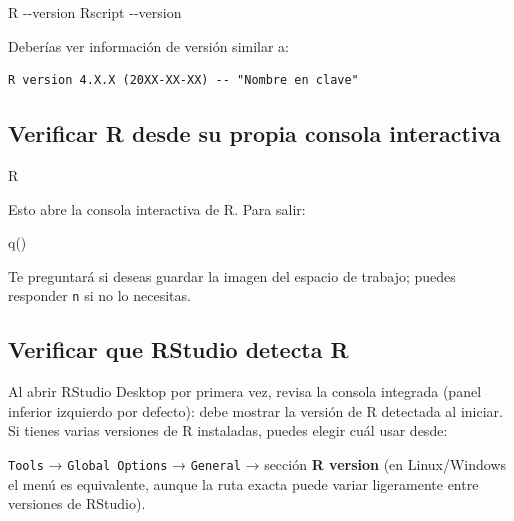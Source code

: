 \documentclass[
  man,
  floatsintext,
  longtable,
  a4paper,
  nolmodern,
  notxfonts,
  notimes,
  12pt,
  colorlinks=true,linkcolor=blue,citecolor=blue,urlcolor=blue]{apa7}
\newenvironment{Shaded}{\begin{snugshade}}{\end{snugshade}}
\newcommand{\AttributeTok}[1]{\textcolor[rgb]{0.40,0.45,0.13}{#1}}
\newcommand{\ExtensionTok}[1]{\textcolor[rgb]{0.00,0.23,0.31}{#1}}
\newcommand{\FunctionTok}[1]{\textcolor[rgb]{0.28,0.35,0.67}{#1}}
\newcommand{\NormalTok}[1]{\textcolor[rgb]{0.00,0.23,0.31}{#1}}
\begin{document}
\begin{Shaded}
\begin{Highlighting}[]
\ExtensionTok{R} \AttributeTok{{-}{-}version}
\ExtensionTok{Rscript} \AttributeTok{{-}{-}version}
\end{Highlighting}
\end{Shaded}

Deberías ver información de versión similar a:

\begin{verbatim}
R version 4.X.X (20XX-XX-XX) -- "Nombre en clave"
\end{verbatim}

\subsection{Verificar R desde su propia consola
interactiva}\label{verificar-r-desde-su-propia-consola-interactiva}

\begin{Shaded}
\begin{Highlighting}[]
\ExtensionTok{R}
\end{Highlighting}
\end{Shaded}

Esto abre la consola interactiva de R. Para salir:

\begin{Shaded}
\begin{Highlighting}[]
\FunctionTok{q}\NormalTok{()}
\end{Highlighting}
\end{Shaded}

Te preguntará si deseas guardar la imagen del espacio de trabajo; puedes
responder \texttt{n} si no lo necesitas.

\subsection{Verificar que RStudio detecta
R}\label{verificar-que-rstudio-detecta-r}

Al abrir RStudio Desktop por primera vez, revisa la consola integrada
(panel inferior izquierdo por defecto): debe mostrar la versión de R
detectada al iniciar. Si tienes varias versiones de R instaladas, puedes
elegir cuál usar desde:

\texttt{Tools} → \texttt{Global\ Options} → \texttt{General} → sección
\textbf{R version} (en Linux/Windows el menú es equivalente, aunque la
ruta exacta puede variar ligeramente entre versiones de RStudio).
\end{document}
